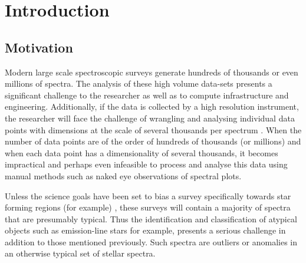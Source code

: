 \chapter{Introduction}
\section{Motivation}
Modern large scale spectroscopic surveys generate hundreds of thousands or even millions of spectra. The analysis of these high volume data-sets presents a significant challenge to the researcher as well as to compute infrastructure and engineering. Additionally, if the data is collected by a high resolution instrument, the researcher will face the challenge of wrangling and analysing individual data points with dimensions at the scale of several thousands per spectrum \cite{buder2021galah+}. When the number of data points are of the order of hundreds of thousands (or millions) and when each data point has a dimensionality of several thousands, it becomes impractical and perhaps even infeasible to process and analyse this data using manual methods such as naked eye observations of spectral plots. 

Unless the science goals have been set to bias a survey specifically towards star forming regions (for example) \cite{traven2015gaia}, these surveys will contain a majority of spectra that are presumably typical. Thus the identification and classification of atypical objects such as emission-line stars for example, presents a serious challenge in addition to those mentioned previously. Such spectra are outliers or anomalies in an otherwise typical set of stellar spectra.

